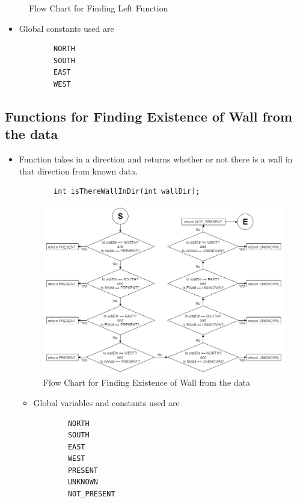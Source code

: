 \documentclass[11pt]{article}
\begin{document}
\begin{itemize}
\begin{figure}[htp]
\caption{Flow Chart for Finding Left Function}
\label{}
\end{figure}
	\begin{itemize}
	\item Global constants used are
	\begin{verbatim}
		NORTH
		SOUTH
		EAST
		WEST
	\end{verbatim}
	\end{itemize}
\end{itemize}
\newpage


\subsection{Functions for Finding Existence of Wall from the data}
\begin{itemize}
\item Function takes in a direction and returns whether or not there is a wall in that direction from known data.
	\begin{verbatim}
		int isThereWallInDir(int wallDir);
	\end{verbatim}
\begin{figure}[htp]
\centering
\includegraphics[scale=0.580]{images/Software_Flowchart/isThereWallInDir.png}
\caption{Flow Chart for Finding Existence of Wall from the data}
\label{}
\end{figure}
	\begin{itemize}
	\item Global variables and constants used are
	\begin{verbatim}
		NORTH
		SOUTH
		EAST
		WEST
		PRESENT
		UNKNOWN
		NOT_PRESENT
	\end{verbatim}
	\end{itemize}
\end{itemize}
\newpage
\end{document}

